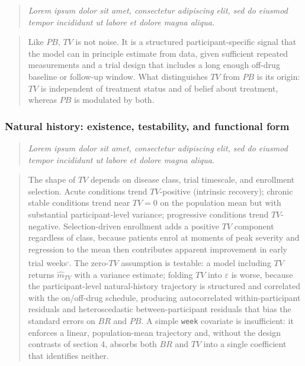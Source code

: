 \documentclass[
  11pt,
]{article}
\newenvironment{rgt}{%
  \begin{quote}\small\itshape\color[RGB]{20,60,160}}{%
  \end{quote}}
\newenvironment{orig}{%
  \begin{quote}\normalsize\color[gray]{0.55}}{%
  \end{quote}}
\begin{document}
\begin{rgt}
Lorem ipsum dolor sit amet, consectetur adipiscing elit, sed do eiusmod tempor incididunt ut labore et dolore magna aliqua.

\end{rgt}

\begin{orig}
Like \(PB\), \(TV\) is not noise. It is a structured
participant-specific signal that the model can in principle
estimate from data, given sufficient repeated measurements and
a trial design that includes a long enough off-drug baseline or
follow-up window. What distinguishes \(TV\) from \(PB\) is its
origin: \(TV\) is independent of treatment status and of belief
about treatment, whereas \(PB\) is modulated by both.

\end{orig}

\subsubsection{Natural history: existence, testability, and functional form}\label{natural-history-existence-testability-and-functional-form}

\begin{rgt}
Lorem ipsum dolor sit amet, consectetur adipiscing elit, sed do eiusmod tempor incididunt ut labore et dolore magna aliqua.

\end{rgt}

\begin{orig}
The shape of \(TV\) depends on disease class, trial timescale, and
enrollment selection. Acute conditions trend \(TV\)-positive
(intrinsic recovery); chronic stable conditions trend near
\(TV = 0\) on the population mean but with substantial
participant-level variance; progressive conditions trend
\(TV\)-negative. Selection-driven enrollment adds a positive \(TV\)
component regardless of class, because patients enrol at moments
of peak severity and regression to the mean then contributes
apparent improvement in early trial weeks\textsuperscript{,}. The zero-\(TV\) assumption is testable: a
model including \(TV\) returns \(\hat{m}_{TV}\) with a variance
estimate; folding \(TV\) into \(\varepsilon\) is worse, because the
participant-level natural-history trajectory is structured and
correlated with the on/off-drug schedule, producing
autocorrelated within-participant residuals and heteroscedastic
between-participant residuals that bias the standard errors on
\(BR\) and \(PB\). A simple \texttt{week} covariate is insufficient:
it enforces a linear, population-mean trajectory and, without
the design contrasts of section 4, absorbs both \(BR\) and \(TV\)
into a single coefficient that identifies neither.

\end{orig}
\end{document}
